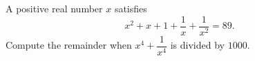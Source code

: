 A positive real number $x$ satisfies
\[x^2+x+1+\dfrac{1}{x}+\dfrac{1}{x^2}=89 .\]
Compute the remainder when $x^4+\dfrac{1}{x^4}$ is divided by $1000$.
